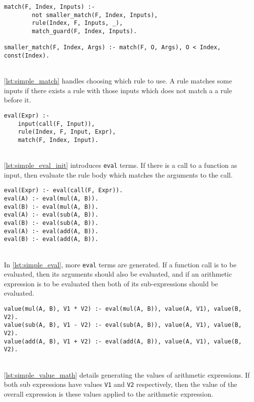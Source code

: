 \begin{lstlisting}[caption={Match rules}, label={lst:simple_match}, firstnumber=123]
match(F, Index, Inputs) :- 
		not smaller_match(F, Index, Inputs), 
		rule(Index, F, Inputs, _), 
		match_guard(F, Index, Inputs).
	
smaller_match(F, Index, Args) :- match(F, O, Args), O < Index, const(Index).
\end{lstlisting}
\mbox{} \\
\ref{lst:simple_match} handles choosing which rule to use. A rule matches some inputs if there exists a rule with those inputs which does not match a a rule before it. \\

\begin{lstlisting}[caption={Eval introduction}, label={lst:simple_eval_init}, firstnumber=75]
eval(Expr) :- 
	input(call(F, Input)), 
	rule(Index, F, Input, Expr), 
	match(F, Index, Input).	
\end{lstlisting}
\mbox{}\\
\ref{lst:simple_eval_init} introduces \lstinline!eval! terms. If there is a call to a function as input, then evaluate the rule body which matches the arguments to the call. \\

\begin{lstlisting}[caption={Eval propagation}, label={lst:simple_eval}, firstnumber=77]
eval(Expr) :- eval(call(F, Expr)).
eval(A) :- eval(mul(A, B)).
eval(B) :- eval(mul(A, B)).
eval(A) :- eval(sub(A, B)).
eval(B) :- eval(sub(A, B)).
eval(A) :- eval(add(A, B)).
eval(B) :- eval(add(A, B)).
\end{lstlisting}
\mbox{}\\
In \ref{lst:simple_eval}, more \lstinline!eval! terms are generated. If a function call is to be evaluated, then its arguments should also be evaluated, and if an arithmetic expression is to be evaluated then both of its sub-expressions should be evaluated. \\ 

\begin{lstlisting}[caption={Value generation for arithmetic}, label={lst:simple_value_math}, firstnumber=69]
value(mul(A, B), V1 * V2) :- eval(mul(A, B)), value(A, V1), value(B, V2).
value(sub(A, B), V1 - V2) :- eval(sub(A, B)), value(A, V1), value(B, V2).
value(add(A, B), V1 + V2) :- eval(add(A, B)), value(A, V1), value(B, V2).
\end{lstlisting}
\mbox{}\\
\ref{lst:simple_value_math} details generating the values of arithmetic expressions. If both sub expressions have values \lstinline!V1! and \lstinline!V2! respectively, then the value of the overall expression is these values applied to the arithmetic expression. \\

